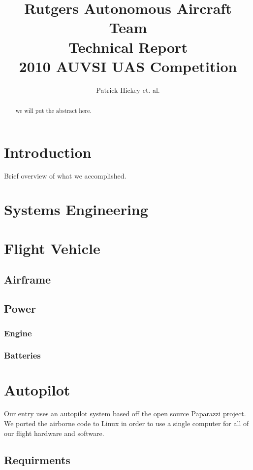 \documentclass[10pt]{report}
\begin{document}
\title{Rutgers Autonomous Aircraft Team\\Technical Report\\2010 AUVSI UAS Competition}
\author{Patrick Hickey et. al.}


\begin{abstract}
we will put the abstract here.
\end{abstract}

\section{Introduction}

Brief overview of what we accomplished.

\section{Systems Engineering}

\section{Flight Vehicle}

\subsection{Airframe}

\subsection{Power}

\subsubsection{Engine}

\subsubsection{Batteries}

\section{Autopilot}
Our entry uses an autopilot system based off the open source 
Paparazzi project\cite{paparazziweb}. 
We ported the airborne code to Linux in order to use a single computer for all of our flight hardware and software.

\subsection{Requirments}
\end{document}
